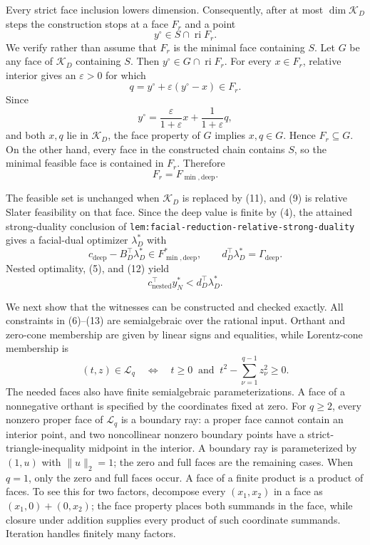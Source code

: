 Every strict face inclusion lowers dimension.  Consequently, after at most \(\dim\mathcal K_D\) steps the construction stops at a face \(F_r\) and a point
\[
 y^\circ\in S\cap\operatorname{ri}F_r.                                \tag{9}
\]
We verify rather than assume that \(F_r\) is the minimal face containing \(S\).  Let \(G\) be any face of \(\mathcal K_D\) containing \(S\).  Then \(y^\circ\in G\cap\operatorname{ri}F_r\).  For every \(x\in F_r\), relative interior gives an \(\varepsilon>0\) for which
\[
 q=y^\circ+\varepsilon(y^\circ-x)\in F_r.
\]
Since
\[
 y^\circ=\frac{\varepsilon}{1+\varepsilon}x
          +\frac{1}{1+\varepsilon}q,                                   \tag{10}
\]
and both \(x,q\) lie in \(\mathcal K_D\), the face property of \(G\) implies \(x,q\in G\).  Hence \(F_r\subseteq G\).  On the other hand, every face in the constructed chain contains \(S\), so the minimal feasible face is contained in \(F_r\).  Therefore
\[
 F_r=F_{\min,\mathrm{deep}}.                                           \tag{11}
\]

The feasible set is unchanged when \(\mathcal K_D\) is replaced by (11), and (9) is relative Slater feasibility on that face.  Since the deep value is finite by (4), the attained strong-duality conclusion of \texttt{lem:facial-reduction-relative-strong-duality} gives a facial-dual optimizer \(\lambda_D^*\) with
\[
 c_{\mathrm{deep}}-B_D^{\top}\lambda_D^*
       \in F_{\min,\mathrm{deep}}^*,
 \qquad
 d_D^{\top}\lambda_D^*=\Gamma_{\mathrm{deep}}.                       \tag{12}
\]
Nested optimality, (5), and (12) yield
\[
 c_{\mathrm{nested}}^{\top}y_N^*
 <d_D^{\top}\lambda_D^*.                                               \tag{13}
\]

We next show that the witnesses can be constructed and checked exactly.  All constraints in (6)--(13) are semialgebraic over the rational input.  Orthant and zero-cone membership are given by linear signs and equalities, while Lorentz-cone membership is
\[
 (t,z)\in\mathcal L_q
 \quad\Longleftrightarrow\quad
 t\geq0\ \text{ and }\ t^2-\sum_{\nu=1}^{q-1}z_\nu^2\geq0.          \tag{14}
\]
The needed faces also have finite semialgebraic parameterizations.  A face of a nonnegative orthant is specified by the coordinates fixed at zero.  For \(q\geq2\), every nonzero proper face of \(\mathcal L_q\) is a boundary ray: a proper face cannot contain an interior point, and two noncollinear nonzero boundary points have a strict-triangle-inequality midpoint in the interior.  A boundary ray is parameterized by \((1,u)\) with \(\|u\|_2=1\); the zero and full faces are the remaining cases.  When \(q=1\), only the zero and full faces occur.  A face of a finite product is a product of faces.  To see this for two factors, decompose every \((x_1,x_2)\) in a face as \((x_1,0)+(0,x_2)\); the face property places both summands in the face, while closure under addition supplies every product of such coordinate summands.  Iteration handles finitely many factors.

